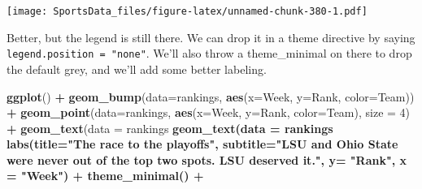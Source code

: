 \documentclass[
]{book}
\newenvironment{Shaded}{\begin{snugshade}}{\end{snugshade}}
\newcommand{\DataTypeTok}[1]{\textcolor[rgb]{0.13,0.29,0.53}{#1}}
\newcommand{\DecValTok}[1]{\textcolor[rgb]{0.00,0.00,0.81}{#1}}
\newcommand{\FloatTok}[1]{\textcolor[rgb]{0.00,0.00,0.81}{#1}}
\newcommand{\KeywordTok}[1]{\textcolor[rgb]{0.13,0.29,0.53}{\textbf{#1}}}
\newcommand{\NormalTok}[1]{#1}
\newcommand{\OperatorTok}[1]{\textcolor[rgb]{0.81,0.36,0.00}{\textbf{#1}}}
\newcommand{\StringTok}[1]{\textcolor[rgb]{0.31,0.60,0.02}{#1}}
\begin{document}
\texttt{[image: SportsData\_files/figure-latex/unnamed-chunk-380-1.pdf]}

Better, but the legend is still there. We can drop it in a theme directive by saying \texttt{legend.position\ =\ "none"}. We'll also throw a theme\_minimal on there to drop the default grey, and we'll add some better labeling.

\begin{Shaded}
\begin{Highlighting}[]
\KeywordTok{ggplot}\NormalTok{() }\OperatorTok{+}\StringTok{ }
\StringTok{  }\KeywordTok{geom_bump}\NormalTok{(}\DataTypeTok{data=}\NormalTok{rankings, }\KeywordTok{aes}\NormalTok{(}\DataTypeTok{x=}\NormalTok{Week, }\DataTypeTok{y=}\NormalTok{Rank, }\DataTypeTok{color=}\NormalTok{Team)) }\OperatorTok{+}\StringTok{ }
\StringTok{  }\KeywordTok{geom_point}\NormalTok{(}\DataTypeTok{data=}\NormalTok{rankings, }\KeywordTok{aes}\NormalTok{(}\DataTypeTok{x=}\NormalTok{Week, }\DataTypeTok{y=}\NormalTok{Rank, }\DataTypeTok{color=}\NormalTok{Team), }\DataTypeTok{size =} \DecValTok{4}\NormalTok{) }\OperatorTok{+}\StringTok{   }
\StringTok{  }\KeywordTok{geom_text}\NormalTok{(}\DataTypeTok{data =}\NormalTok{ rankings }\OperatorTok{%
\StringTok{  }\KeywordTok{geom_text}\NormalTok{(}\DataTypeTok{data =}\NormalTok{ rankings }\OperatorTok{%
\StringTok{  }\KeywordTok{labs}\NormalTok{(}\DataTypeTok{title=}\StringTok{"The race to the playoffs"}\NormalTok{, }\DataTypeTok{subtitle=}\StringTok{"LSU and Ohio State were never out of the top two spots. LSU deserved it."}\NormalTok{, }\DataTypeTok{y=} \StringTok{"Rank"}\NormalTok{, }\DataTypeTok{x =} \StringTok{"Week"}\NormalTok{) }\OperatorTok{+}
\StringTok{  }\KeywordTok{theme_minimal}\NormalTok{() }\OperatorTok{+}
}}
\end{Highlighting}
\end{Shaded}
\end{document}
